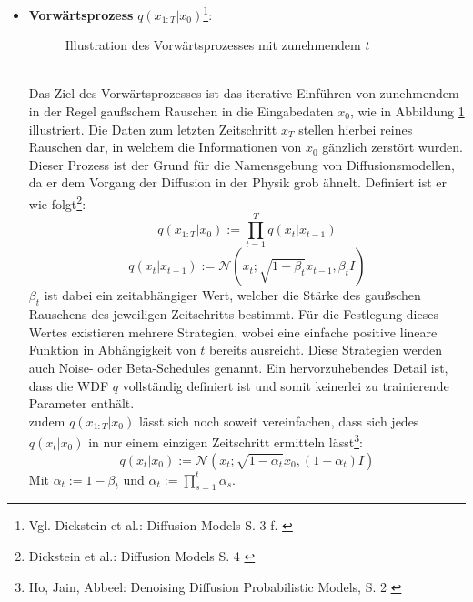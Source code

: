 \begin{itemize}
    \item \textbf{Vorwärtsprozess} $q(x_{1:T}|x_0)$\footnote{
       Vgl.  Dickstein et al.: Diffusion Models S. 3 f. 
        \cite{pmlr-v37-sohl-dickstein15}
    }: \\
    \begin{figure}[htbp]
        \centering
        \caption{Illustration des Vorwärtsprozesses mit zunehmendem $t$}
        \label{fig:forward_process}
    \end{figure} \\
    Das Ziel des Vorwärtsprozesses ist das iterative Einführen von zunehmendem in der Regel gaußschem Rauschen in die Eingabedaten $x_0$, wie in Abbildung \ref{fig:forward_process} illustriert. Die Daten zum letzten Zeitschritt $x_T$ stellen hierbei reines Rauschen dar, in welchem die Informationen von $x_0$ gänzlich zerstört wurden. Dieser Prozess ist der Grund für die Namensgebung von Diffusionsmodellen, da er dem Vorgang der Diffusion in der Physik grob ähnelt. Definiert ist er wie folgt\footnote{
        Dickstein et al.: Diffusion Models S. 4
        \cite{pmlr-v37-sohl-dickstein15}
    }:
    \begin{equation}
        q(x_{1:T}|x_0) := \prod_{t=1}^T q(x_t | x_{t-1}) 
    \end{equation}
    \begin{equation}
        q(x_t|x_{t-1}) :=  \mathcal N(x_t; \sqrt{1-\beta_t}x_{t-1}, \beta_t I)
    \end{equation}
    $\beta_t$ ist dabei ein zeitabhängiger Wert, welcher die Stärke des gaußschen Rauschens des jeweiligen Zeitschritts bestimmt. Für die Festlegung dieses Wertes existieren mehrere Strategien, wobei eine einfache positive lineare Funktion in Abhängigkeit von $t$ bereits ausreicht. Diese Strategien werden auch Noise- oder Beta-Schedules genannt. Ein hervorzuhebendes Detail ist, dass die \ac{WDF} $q$ vollständig definiert ist und somit keinerlei zu trainierende Parameter enthält. \\
    zudem $q(x_{1:T}|x_0)$ lässt sich noch soweit vereinfachen, dass sich jedes $q(x_t|x_0)$ in nur einem einzigen Zeitschritt ermitteln lässt\footnote{
        Ho, Jain, Abbeel: Denoising Diffusion Probabilistic Models, S. 2
        \cite{ho2020denoisingdiffusionprobabilisticmodels}
    }:
    \begin{equation}
        q(x_t|x_0) :=  
        \mathcal N(x_t; \sqrt{1-\bar\alpha_t}x_0, (1 - \bar \alpha_t) I)
    \end{equation}
    Mit $\alpha_t := 1 - \beta_t$ und $\bar\alpha_t := \prod_{s=1}^t \alpha_s$.


\end{itemize}
